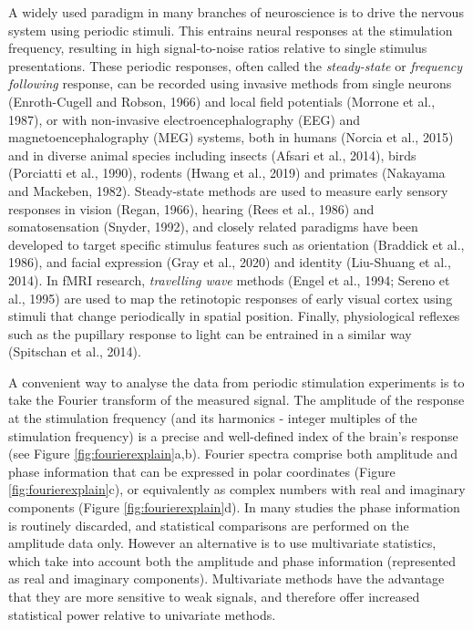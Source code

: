 \documentclass[]{article}
\begin{document}
A widely used paradigm in many branches of neuroscience is to drive the nervous system using periodic stimuli. This entrains neural responses at the stimulation frequency, resulting in high signal-to-noise ratios relative to single stimulus presentations. These periodic responses, often called the \emph{steady-state} or \emph{frequency following} response, can be recorded using invasive methods from single neurons (Enroth-Cugell and Robson, 1966) and local field potentials (Morrone et al., 1987), or with non-invasive electroencephalography (EEG) and magnetoencephalography (MEG) systems, both in humans (Norcia et al., 2015) and in diverse animal species including insects (Afsari et al., 2014), birds (Porciatti et al., 1990), rodents (Hwang et al., 2019) and primates (Nakayama and Mackeben, 1982). Steady-state methods are used to measure early sensory responses in vision (Regan, 1966), hearing (Rees et al., 1986) and somatosensation (Snyder, 1992), and closely related paradigms have been developed to target specific stimulus features such as orientation (Braddick et al., 1986), and facial expression (Gray et al., 2020) and identity (Liu-Shuang et al., 2014). In fMRI research, \emph{travelling wave} methods (Engel et al., 1994; Sereno et al., 1995) are used to map the retinotopic responses of early visual cortex using stimuli that change periodically in spatial position. Finally, physiological reflexes such as the pupillary response to light can be entrained in a similar way (Spitschan et al., 2014).

A convenient way to analyse the data from periodic stimulation experiments is to take the Fourier transform of the measured signal. The amplitude of the response at the stimulation frequency (and its harmonics - integer multiples of the stimulation frequency) is a precise and well-defined index of the brain's response (see Figure \ref{fig:fourierexplain}a,b). Fourier spectra comprise both amplitude and phase information that can be expressed in polar coordinates (Figure \ref{fig:fourierexplain}c), or equivalently as complex numbers with real and imaginary components (Figure \ref{fig:fourierexplain}d). In many studies the phase information is routinely discarded, and statistical comparisons are performed on the amplitude data only. However an alternative is to use multivariate statistics, which take into account both the amplitude and phase information (represented as real and imaginary components). Multivariate methods have the advantage that they are more sensitive to weak signals, and therefore offer increased statistical power relative to univariate methods.
\end{document}
